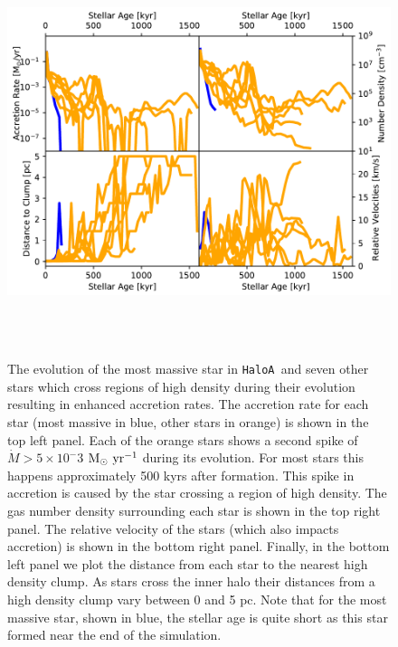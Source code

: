 \documentclass[twocolumn,iop,revtex4]{openjournal}
\newcommand{\msolaryr} {$\rm{M_{\odot}~yr^{-1}}~$}
\newcommand{\ha} {\texttt{HaloA~}}
\begin{document}
\begin{figure}
\centering
\begin{minipage}{175mm}      \begin{center}
\centerline{
    \includegraphics[width=18.0cm, height=12cm]{FIGURES/MultiplicityPlots.pdf}}
\caption{The evolution of the most massive star in \ha and seven other stars which
  cross regions of high density during their evolution resulting in enhanced accretion rates.
  The accretion rate for each star (most massive in blue, other stars in orange) is shown in the
  top left panel. Each of the orange stars shows a second spike of $\dot{M} > 5 \times 10^-3$
  \msolaryr during its evolution. For most stars this happens approximately 500 kyrs after
  formation. This spike in accretion is caused by the star crossing a region of high density.
  The gas number density surrounding each star is shown in the top right panel. The
  relative velocity of the stars (which also impacts accretion) is shown in the bottom
  right panel. Finally, in the bottom left panel we plot the distance from each star to the
  nearest high density clump. As stars cross the inner halo their distances from a high density
  clump vary between 0 and 5 pc. Note that for the most massive star, shown in blue, the stellar
  age is quite short as this star formed near the end of the simulation.}
\label{Fig:Clumps}
\end{center} \end{minipage}
\end{figure}
\end{document}
